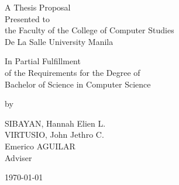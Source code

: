 %
%
%                 

\begin{titlepage}
\centering



\vspace{1.75cm}
A Thesis Proposal\\
Presented to\\
the Faculty of the College of Computer Studies\\
De La Salle University Manila

\vspace{1.75cm}
In Partial Fulfillment\\
of the Requirements for the Degree of\\
Bachelor of  Science in Computer Science

\vspace{1.75cm}
by\\
\vspace{1cm}

SIBAYAN, Hannah Elien L. \\
VIRTUSIO, John Jethro C.  \\

\vspace{1.75cm}
Emerico AGUILAR \\
Adviser

\vspace{1.75cm}
\today
\end{titlepage}
